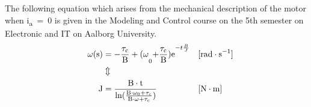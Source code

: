 The following equation which arises from the mechanical description of the motor when \si{i_a = 0} is given in the Modeling and Control course on the 5th semester on Electronic and IT on Aalborg University.
\begin{align}
  \eq{\omega(s)}{- \frac{\tau_c}{B}+(\omega_0 + \frac{\tau_c}{B}) e^{-t\frac{B}{J}}} \unit{rad\cdot s^{-1}}\nonumber\\
  && &\Updownarrow&&\\
  \eq{J}{ \frac{B\cdot t}{ln(  \frac{B\cdot \omega_0 + \tau_c}{B \cdot \omega + \tau_c})} } \unit{N\cdot m}\nonumber
\end{align}




